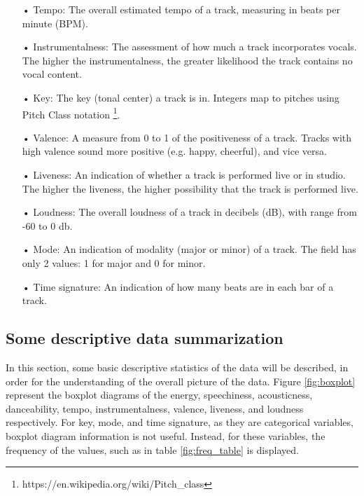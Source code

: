 \begin{itemize}
\item[•] Tempo: The overall estimated tempo of a track, measuring in beats per minute (BPM).
\item[•] Instrumentalness: The assessment of how much a track incorporates vocals. The higher the instrumentalness, the greater likelihood the track contains no vocal content. 
\item[•] Key: The key (tonal center) a track is in. Integers map to pitches using Pitch Class notation \footnote{https://en.wikipedia.org/wiki/Pitch\_class}. 
\item[•] Valence: A measure from 0 to 1 of the positiveness of a track. Tracks with high valence sound more positive (e.g. happy, cheerful), and vice versa.
\item[•] Liveness: An indication of whether a track is performed live or in studio. The higher the liveness, the higher possibility that the track is performed live.
\item[•] Loudness: The overall loudness of a track in decibels (dB), with range from -60 to 0 db. 
\item[•] Mode: An indication of modality (major or minor) of a track. The field has only 2 values: 1 for major and 0 for minor.
\item[•] Time signature: An indication of how many beats are in each bar of a track. 
\end{itemize}

\subsection{Some descriptive data summarization}

In this section, some basic descriptive statistics of the data will be described, in order for the understanding of the overall picture of the data. Figure \ref{fig:boxplot} represent the boxplot diagrams of the energy, speechiness, acousticness, danceability, tempo, instrumentalness, valence, liveness, and loudness respectively. For key, mode, and time signature, as they are categorical variables, boxplot diagram information is not useful. Instead, for these variables, the frequency of the values, such as in table \ref{fig:freq_table} is displayed.

